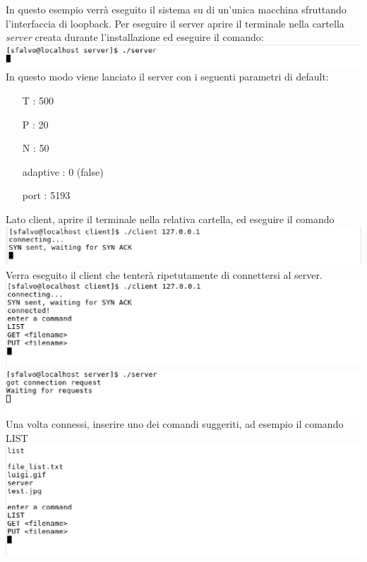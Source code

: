 In questo esempio verrà eseguito il sistema su di un'unica macchina
sfruttando l'interfaccia di loopback.
Per eseguire il server aprire il terminale nella cartella \emph{server}
creata durante l'installazione ed eseguire il comando:\\
\includegraphics[scale=0.5]{images/esempio/srv_launch}\\
In questo modo viene lanciato il server con i seguenti parametri di default:
\begin{itemize}
\item[T]: 500 
\item[P]: 20
\item[N]: 50
\item[adaptive]: 0 (false)
\item[port]: 5193 
\end{itemize}
Lato client, aprire il terminale nella relativa cartella, ed eseguire il 
comando\\ 
\includegraphics[scale=0.5]{images/esempio/cli_connect}\\
Verra eseguito il client che tenterà ripetutamente di
connettersi al server.\\
\includegraphics[scale=0.5]{images/esempio/cli_wait}\\
\includegraphics[scale=0.5]{images/esempio/srv_wait}\\
Una volta connessi, inserire uno dei comandi suggeriti, ad esempio il comando LIST\\
\includegraphics[scale=0.5]{images/esempio/cli_list}\\
